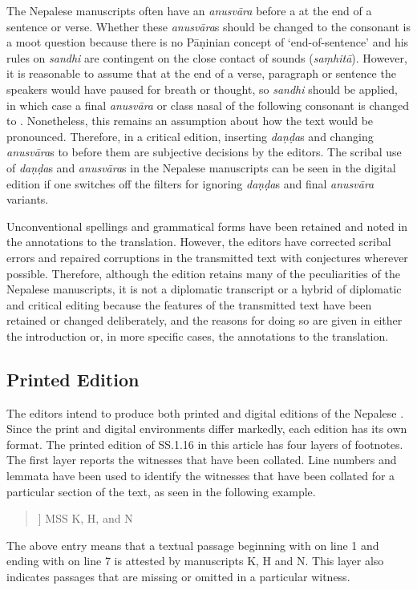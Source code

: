 The Nepalese manuscripts often have an \emph{anusvāra} before a 
 at the end of a sentence or verse. Whether these 
\emph{anusvāra}s should be changed to the consonant  is a moot 
question because there is no Pāṇinian concept of `end-of-sentence' and his rules 
on \emph{sandhi} are contingent on the close contact of  sounds 
(\emph{saṃhitā}). However, it is reasonable to assume that at the end 
of a verse, paragraph or sentence the speakers would have paused for breath or 
thought, so \emph{sandhi} should be applied, in which case a final 
\emph{anusvāra} or class nasal of the following consonant is changed to 
.  Nonetheless, this remains an assumption about how the text would 
be pronounced. Therefore, in a critical edition, inserting \emph{daṇḍa}s and 
changing \emph{anusvāra}s to  before them are subjective decisions 
by the editors. The scribal use of \emph{daṇḍa}s and \emph{anusvāra}s in the 
Nepalese manuscripts can be seen in the digital edition if one switches off the 
filters for ignoring \emph{daṇḍa}s and final \emph{anusvāra} variants. 

Unconventional spellings and grammatical forms have been retained and noted in 
the annotations to the translation. However, the editors have corrected scribal 
errors and repaired corruptions in the transmitted text with conjectures wherever 
possible. Therefore, although the edition retains many of the peculiarities of the 
Nepalese manuscripts, it is not a diplomatic transcript or a hybrid of diplomatic 
and critical editing because the features of the transmitted text have been 
retained or changed deliberately, and the reasons for doing so are given in either 
the introduction or, in more specific cases, the annotations to the translation.

\subsection{Printed Edition}
The editors intend to produce both printed and digital editions of the Nepalese 
\SS. Since the print and digital environments differ markedly, each edition has 
its own format. The printed edition of SS.1.16 in this article has four layers of footnotes. The first layer reports the witnesses that have been collated. Line numbers and lemmata have been used to identify the witnesses that have been collated for a particular section of the text, as seen in the following example.
\begin{quote}
 ] MSS K, H, and N
\end{quote}
The above entry means that a textual passage beginning with  on line 1 and ending with  on line 7 is attested by manuscripts K, H and N. This layer also indicates passages that are missing or omitted in a particular witness. 

